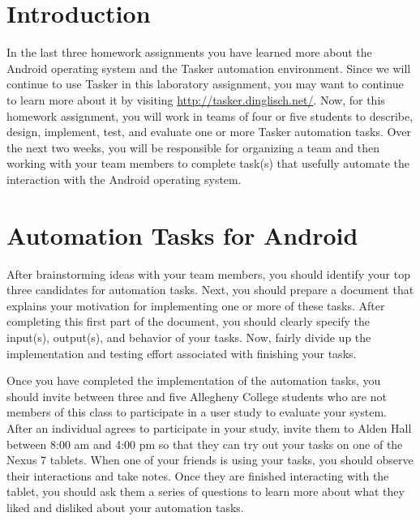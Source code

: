 

\usepackage[compact]{titlesec}



\section*{Introduction}

In the last three homework assignments you have learned more about the Android operating system and the Tasker
automation environment. Since we will continue to use Tasker in this laboratory assignment, you may want to continue to
learn more about it by visiting \url{http://tasker.dinglisch.net/}.  Now, for this homework assignment, you will work in
teams of four or five students to describe, design, implement, test, and evaluate one or more Tasker automation tasks.
Over the next two weeks, you will be responsible for organizing a team and then working with your team members to
complete task(s) that usefully automate the interaction with the Android operating system.

\section*{Automation Tasks for Android}

After brainstorming ideas with your team members, you should identify your top three candidates for automation tasks.
Next, you should prepare a document that explains your motivation for implementing one or more of these tasks.  After
completing this first part of the document, you should clearly specify the input(s), output(s), and behavior of your
tasks. Now, fairly divide up the implementation and testing effort associated with finishing your tasks. 

Once you have completed the implementation of the automation tasks, you should invite between three and five Allegheny
College students who are not members of this class to participate in a user study to evaluate your system.  After an
individual agrees to participate in your study, invite them to Alden Hall between 8:00 am and 4:00 pm so that they can
try out your tasks on one of the Nexus 7 tablets. When one of your friends is using your tasks, you should observe their
interactions and take notes.  Once they are finished interacting with the tablet, you should ask them a series of
questions to learn more about what they liked and disliked about your automation tasks.  

